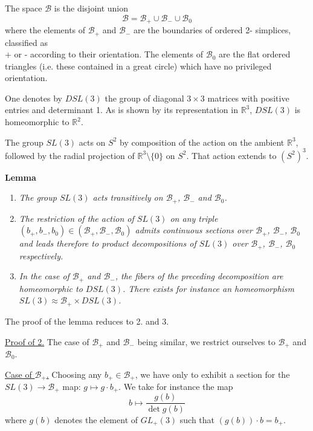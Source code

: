 \documentclass[12pt]{article}
\begin{document}
The space $\mathcal{B}$ is the disjoint union
\begin{equation*}
\mathcal{B} = \mathcal{B}_+ \cup \mathcal{B}_- \cup \mathcal{B}_0
\end{equation*}
where the elements of $\mathcal{B}_+$ and $\mathcal{B}_-$ are the boundaries of ordered 2-
simplices, classified as\\ + or - according to their orientation. The elements of $\mathcal{B}_0$ are the
flat ordered triangles (i.e. these contained in a great circle) which have no privileged orientation.


 One denotes by $DSL(3)$ the group of diagonal $3 \times 3$ matrices with positive entries and determinant 1.
As is shown by its representation in $\mathbb{R}^3$, $DSL(3)$ is homeomorphic to $\mathbb{R}^2$.

The group $SL(3)$ acts on $S^2$ by composition of the action on the ambient $\mathbb{R}^3$, followed by the radial projection of $\mathbb{R}^3 \setminus \{0\}$ on $S^2$. That action extends to $(S^2)^3$.

\textbf{Lemma} \begin{enumerate}\item \emph{The group $SL(3)$ acts transitively on $\mathcal{B}_+$, $\mathcal{B}_-$ and $\mathcal{B}_0$.}

\item \emph{The restriction of the action of $SL(3)$ on any triple $(b_+, b_-, b_0) \in (\mathcal{B}_+, \mathcal{B}_-, \mathcal{B}_0)$ admits continuous sections over $\mathcal{B}_+$, $\mathcal{B}_-$, $\mathcal{B}_0$ and leads therefore to product decompositions of $SL(3)$ over $\mathcal{B}_+$, $\mathcal{B}_-$, $\mathcal{B}_0$ respectively.}

\item \emph{In the case of $\mathcal{B}_+$ and $\mathcal{B}_-$, the fibers of the preceding decomposition are homeomorphic to $DSL(3)$. There exists for instance an homeomorphism $SL(3) \approx \mathcal{B}_+ \times DSL(3)$.}
\end{enumerate}
The proof of the lemma reduces to 2. and 3.

\underline{Proof of 2.} The case of $\mathcal{B}_+$ and $\mathcal{B}_-$ being similar, we restrict ourselves to $\mathcal{B}_+$ and $\mathcal{B}_0$.

\underline{Case of $\mathcal{B}_+$.}  Choosing any $b_+ \in \mathcal{B}_+$, we have only to exhibit a section for the $SL(3) \to \mathcal{B}_+$ map: $g \mapsto g \cdot b_+$. We take for instance the map
    \[
    b \longmapsto \frac{g(b)}{\det g(b)}
    \]
    where $g(b)$ denotes the element of $GL_+(3)$ such that $(g(b)) \cdot b = b_+$.
\end{document}
